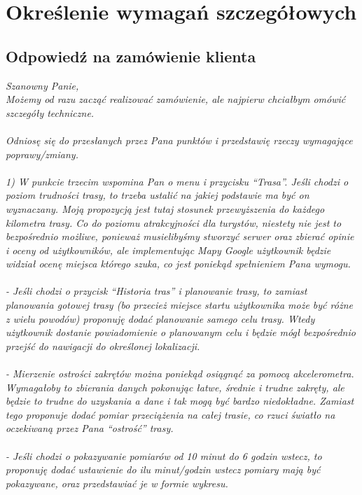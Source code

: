 	\newpage
\section{Określenie wymagań szczegółowych}		%
\subsection{Odpowiedź na zamówienie klienta}  %

\hspace{1cm}
\textit{
Szanowny Panie,\\
Możemy od razu zacząć realizować zamówienie, ale najpierw chciałbym omówić szczegóły techniczne. \\\\
Odniosę się do przesłanych przez Pana punktów i przedstawię rzeczy wymagające poprawy/zmiany.\\\\
1) W punkcie trzecim wspomina Pan o menu i przycisku ``Trasa''. Jeśli chodzi o poziom trudności trasy, to trzeba ustalić na jakiej podstawie ma być on wyznaczany. Moją propozycją jest tutaj stosunek przewyższenia do każdego kilometra trasy. Co do poziomu atrakcyjności dla turystów, niestety nie jest to bezpośrednio możliwe, ponieważ musielibyśmy stworzyć serwer oraz zbierać opinie i oceny od użytkowników, ale implementując Mapy Google użytkownik będzie widział ocenę miejsca którego szuka, co jest poniekąd spełnieniem Pana wymogu. \\\\
- Jeśli chodzi o przycisk ``Historia tras'' i planowanie trasy, to zamiast planowania gotowej trasy (bo przecież miejsce startu użytkownika może być różne z wielu powodów) proponuję dodać planowanie samego celu trasy. Wtedy użytkownik dostanie powiadomienie o planowanym celu i będzie mógł bezpośrednio przejść do nawigacji do określonej lokalizacji. \\\\
- Mierzenie ostrości zakrętów można poniekąd osiągnąć za pomocą akcelerometra. Wymagałoby to zbierania danych pokonując łatwe, średnie i trudne zakręty, ale będzie to trudne do uzyskania a dane i tak mogą być bardzo niedokładne. Zamiast tego proponuje dodać pomiar przeciążenia na całej trasie, co rzuci światło na oczekiwaną przez Pana ``ostrość'' trasy. \\\\
- Jeśli chodzi o pokazywanie pomiarów od 10 minut do 6 godzin wstecz, to proponuję dodać ustawienie do ilu minut/godzin wstecz pomiary mają być pokazywane, oraz przedstawiać je w formie wykresu. \\\\
}
